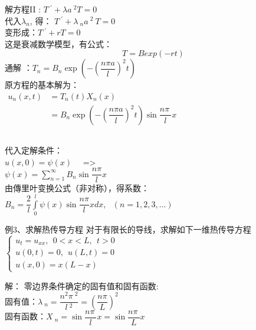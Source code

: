 \begin{frame}
	\frametitle{}	
	解方程II : 	$\displaystyle  T~^{'} +\lambda {a~^2 T}=0 $ \\ 
	代入$\lambda_n$, 得：
	$\displaystyle  T~^{'} +\lambda~_n a~^2 ~T=0 $ \\
	变形成：$\displaystyle  T~^{'} + rT=0 $ \\ 
	这是衰减数学模型，有公式：
	\begin{equation*}
		T= Bexp(-rt)
	\end{equation*}
	通解 ：$\displaystyle T_n=B_n  \exp(-(\dfrac{n\pi a}{l})^2 t)$ \\  
	原方程的基本解为：\\ \vspace{0.3cm}
	$\begin{array}{llll}
		u_n(x,t) &= T_n(t)X_n(x)\\
		&= B_n  \exp(-(\dfrac{n\pi a}{l})^2 t) \sin \dfrac{n\pi~}{l} x \\
	\end{array}$ \\ 
\end{frame}	

\begin{frame}
	\frametitle{}	
	代入定解条件：\\ 
	$ \displaystyle u(x,0)= \psi(x)$ ~~=> \\
	$\psi (x)=\sum\limits_{n=1}^{\infty } B_n \sin \dfrac{ n\pi }{l} x$\\  
	由傳里叶变换公式（非对称），得系数：\\  
	$ \displaystyle B_n=  \dfrac{2}{l}\int\limits_{0 }^{l}  \psi (x) \sin \dfrac{ n\pi }{l} x dx , ~~~ (n=1,2,3,...) $\\   
\end{frame}	

\begin{frame}
	\begin{exampleblock} {例3、求解热传导方程}
	对于有限长的导线，求解如下一维热传导方程 
	$\displaystyle \begin{cases}
		u_{t} =u_{xx} ,~~ 0<x<L, ~~t>0\\
		u(0,t) =0, ~~u(L,t)=0 \\
		u(x,0) =x(L-x)
	\end{cases}$ \\
	\end{exampleblock}
	\alert{解：} 
	零边界条件确定的固有值和固有函数:\\
	固有值：$\displaystyle  \lambda~_n=\dfrac{n^2\pi~^2}{l~^2 }= (\dfrac{n\pi }{L}) ^2$ \\ 
	固有函数：$\displaystyle  X~_n=\sin \dfrac{n\pi~}{l} x=\sin \dfrac{n\pi~}{L} x $\\	
\end{frame}	

